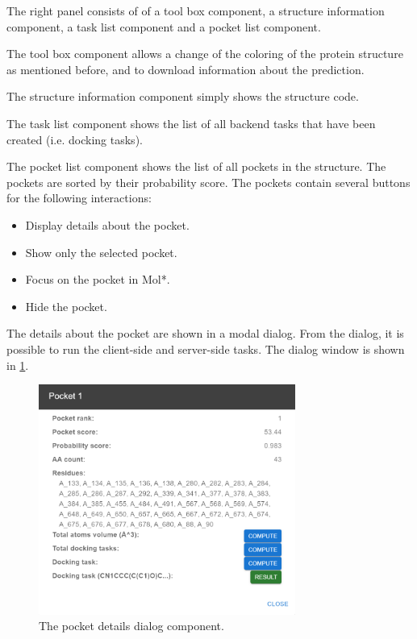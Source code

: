 The right panel consists of of a tool box component, a structure information component, a task list component and a pocket list component. 

The tool box component allows a change of the coloring of the protein structure as mentioned before, and to download information about the prediction.

The structure information component simply shows the structure code.

The task list component shows the list of all backend tasks that have been created (i.e. docking tasks).

The pocket list component shows the list of all pockets in the structure. The pockets are sorted by their probability score. The pockets contain several buttons for the following interactions:

\begin{itemize}
    \item Display details about the pocket.
    \item Show only the selected pocket.
    \item Focus on the pocket in Mol*.
    \item Hide the pocket.
\end{itemize}

The details about the pocket are shown in a modal dialog. From the dialog, it is possible to run the client-side and server-side tasks. The dialog window is shown in \cref{fig:pocket_details}.

\begin{figure}[ht]
    \centering
    \includegraphics[width=0.75\textwidth]{img/pw_pocketdetails.png}
    \caption{The pocket details dialog component.}
    \label{fig:pocket_details}
\end{figure}

